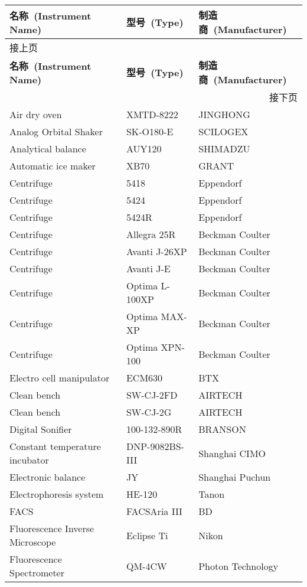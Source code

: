 \begin{longtable}{lll @{}}
\toprule
\textbf{名称\ (Instrument Name)} & \textbf{型号\ (Type)} & \textbf{制造商\ (Manufacturer)}\\
\midrule
\endfirsthead
\multicolumn{3}{l}{\footnotesize 接上页}\\
\toprule
\textbf{名称\ (Instrument Name)} & \textbf{型号\ (Type)} & \textbf{制造商\ (Manufacturer)}\\
\midrule
\endhead
\hline
\multicolumn{3}{r}{\footnotesize 接下页}\\
\endfoot
\endlastfoot
\rowcolors{1}{white}{lightgray}
Air dry oven	&	XMTD-8222	&	JINGHONG	\\
Analog Orbital Shaker & SK-O180-E & SCILOGEX\\
Analytical balance	&	AUY120	&	SHIMADZU	\\
Automatic ice maker	&	XB70	&	GRANT	\\
Centrifuge	&	5418	&	Eppendorf	\\
Centrifuge	&	5424	&	Eppendorf	\\
Centrifuge	&	5424R	&	Eppendorf	\\
Centrifuge  &   Allegra 25R & Beckman Coulter\\
Centrifuge  &   Avanti J-26XP & Beckman Coulter\\
Centrifuge	&	Avanti J-E	&	Beckman Coulter	\\
Centrifuge  &   Optima L-100XP & Beckman Coulter\\
Centrifuge  &   Optima MAX-XP  & Beckman Coulter\\
Centrifuge  &   Optima XPN-100 & Beckman Coulter\\
Electro cell manipulator	&	ECM630	&	BTX	\\
Clean bench	&	SW-CJ-2FD	&	AIRTECH	\\
Clean bench	&	SW-CJ-2G	&	AIRTECH	\\
Digital Sonifier & 100-132-890R & BRANSON\\
Constant temperature incubator	&	DNP-9082BS-III	&	Shanghai CIMO	\\
Electronic balance	&	JY	&	Shanghai Puchun	\\
Electrophoresis system	&	HE-120	&	Tanon	\\
FACS & FACSAria III & BD \\
Fluorescence Inverse Microscope	&	Eclipse Ti	&	Nikon	\\
Fluorescence Spectrometer & QM-4CW & Photon Technology\\

\end{longtable}
